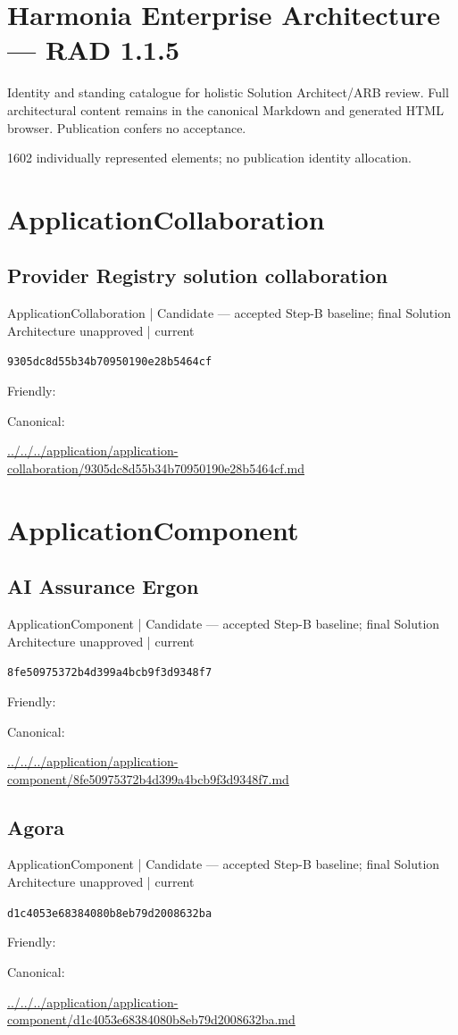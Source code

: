\documentclass[10pt,a4paper]{article}
\begin{document}
\section*{Harmonia Enterprise Architecture — RAD 1.1.5}
Identity and standing catalogue for holistic Solution Architect/ARB review. Full architectural content remains in the canonical Markdown and generated HTML browser. Publication confers no acceptance.\par
1602 individually represented elements; no publication identity allocation.\par
\section*{ApplicationCollaboration}
\subsection*{Provider Registry solution collaboration}
{\small ApplicationCollaboration | Candidate — accepted Step-B baseline; final Solution Architecture unapproved | current}\par
\texttt{9305dc8d55b34b70950190e28b5464cf}\par
Friendly: \par
Canonical: \par
{\footnotesize\url{../../../application/application-collaboration/9305dc8d55b34b70950190e28b5464cf.md}}\par
\section*{ApplicationComponent}
\subsection*{AI Assurance Ergon}
{\small ApplicationComponent | Candidate — accepted Step-B baseline; final Solution Architecture unapproved | current}\par
\texttt{8fe50975372b4d399a4bcb9f3d9348f7}\par
Friendly: \par
Canonical: \par
{\footnotesize\url{../../../application/application-component/8fe50975372b4d399a4bcb9f3d9348f7.md}}\par
\subsection*{Agora}
{\small ApplicationComponent | Candidate — accepted Step-B baseline; final Solution Architecture unapproved | current}\par
\texttt{d1c4053e68384080b8eb79d2008632ba}\par
Friendly: \par
Canonical: \par
{\footnotesize\url{../../../application/application-component/d1c4053e68384080b8eb79d2008632ba.md}}\par
\end{document}
